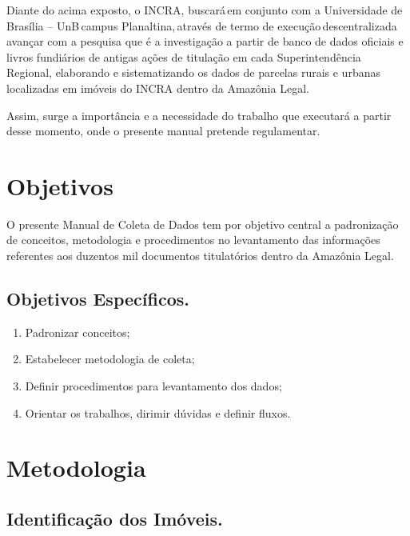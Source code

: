 \documentclass[
  letterpaper,
]{report}
\providecommand{\tightlist}{%
  \setlength{\itemsep}{0pt}\setlength{\parskip}{0pt}}\usepackage{longtable,booktabs,array}
\begin{document}
Diante do acima exposto, o INCRA, buscará\,em conjunto com a
Universidade de Brasília -- UnB\,campus Planaltina,\,através de termo de
execução\,descentralizada avançar com a pesquisa que é a investigação a
partir de banco de dados oficiais e livros fundiários de antigas ações
de titulação em cada Superintendência Regional, elaborando e
sistematizando os dados de parcelas rurais e urbanas localizadas em
imóveis do INCRA dentro da Amazônia Legal. \,~

Assim, surge a importância e a necessidade do trabalho que executará a
partir desse momento, onde o presente manual pretende regulamentar.~


\hypertarget{objetivos}{%
\chapter{Objetivos}\label{objetivos}}

O presente Manual de Coleta de Dados tem por objetivo central a
padronização de conceitos, metodologia e procedimentos no levantamento
das informações referentes aos duzentos mil documentos titulatórios
dentro da Amazônia Legal.

\hypertarget{objetivos-especuxedficos.}{%
\section{Objetivos Específicos.}\label{objetivos-especuxedficos.}}

\begin{enumerate}
\def\labelenumi{\arabic{enumi}.}
\tightlist
\item
  Padronizar conceitos;
\item
  Estabelecer metodologia de coleta;
\item
  Definir procedimentos para levantamento dos dados;
\item
  Orientar os trabalhos, dirimir dúvidas e definir fluxos.
\end{enumerate}


\hypertarget{metodologia}{%
\chapter{Metodologia}\label{metodologia}}

\hypertarget{identificauxe7uxe3o-dos-imuxf3veis.}{%
\section{Identificação dos
Imóveis.}\label{identificauxe7uxe3o-dos-imuxf3veis.}}
\end{document}
